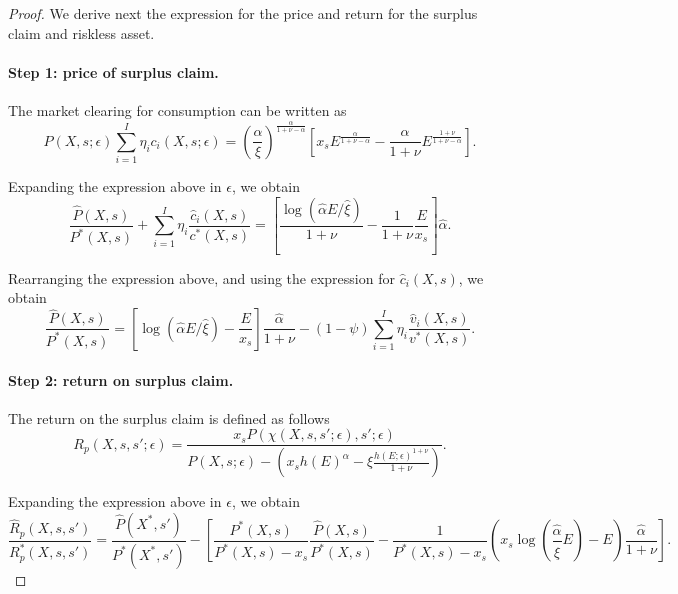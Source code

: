 \begin{proof} We derive next the expression for the price and return for the surplus claim and riskless asset.
\paragraph{Step 1: price of surplus claim.} The market clearing for consumption can be written as
\begin{equation}
    P(X,s;\epsilon) \sum_{i=1}^I \eta_i c_i(X,s;\epsilon) = \left( \frac{\alpha }{\xi} \right)^{\frac{\alpha}{1+\nu-\alpha}} \left[x_s E^{\frac{\alpha}{1+\nu-\alpha}} - \frac{\alpha}{1+\nu}  E^{\frac{1+\nu}{1+\nu-\alpha}}\right].
\end{equation}

Expanding the expression above in $\epsilon$, we obtain
\begin{equation}
    \frac{\hat{P}(X,s)}{P^*(X,s)} + \sum_{i=1}^I \eta_i \frac{\hat{c}_i(X,s)}{c^*(X,s)} = \left[\frac{\log (\hat{\alpha} E / \hat{\xi})}{1+\nu} - \frac{1}{1+\nu} \frac{E}{x_s}\right] \hat{\alpha}.
\end{equation}

Rearranging the expression above, and using the expression for $\hat{c}_i(X,s)$, we obtain
\begin{equation}
    \frac{\hat{P}(X,s)}{P^*(X,s)}  = \left[\log (\hat{\alpha} E / \hat{\xi}) -  \frac{E}{x_s}\right] \frac{\hat{\alpha}}{1+\nu} - (1-\psi) \sum_{i=1}^I \eta_i \frac{\hat{v}_i(X,s)}{v^*(X,s)}.
\end{equation}


\paragraph{Step 2: return on surplus claim.} The return on the surplus claim is defined as follows
\begin{equation}
    R_p(X,s,s';\epsilon) = \frac{x_s P(\chi(X,s,s';\epsilon), s';\epsilon)}{P(X,s;\epsilon) - \left( x_s h(E)^\alpha - \xi \frac{h(E;\epsilon)^{1+\nu}}{1+\nu} \right)}.
\end{equation}

Expanding the expression above in $\epsilon$, we obtain
\begin{equation}
    \frac{\hat{R}_{p}(X,s,s')}{R_p^*(X,s,s')} = \frac{\hat{P}(X^*,s')}{P^*(X^*,s')} - \left[\frac{P^*(X,s)}{P^*(X,s) - x_s } \frac{\hat{P}(X,s)}{P^*(X,s)} -\frac{1}{P^*(X,s) - x_s } \left(  x_s\log\left( \frac{\hat{\alpha}}{\hat{\xi}} E\right)  -E \right)   \frac{\hat{\alpha}}{1+\nu} \right].
\end{equation}


\end{proof}
